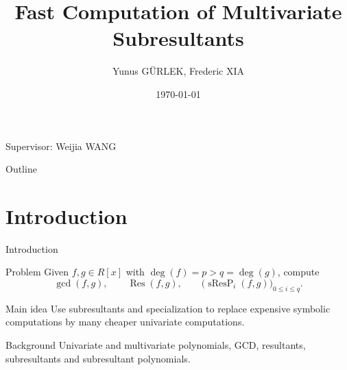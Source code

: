 \documentclass[aspectratio=169]{beamer}
\title{Fast Computation of Multivariate Subresultants}
\author{Yunus GÜRLEK, Frederic XIA}
\date{\today}
\newcommand{\Res}{\operatorname{Res}}
\newcommand{\sResP}{\operatorname{sResP}}
\begin{document}
\begin{frame}
  \centering
  {\Large \inserttitle \par}
  \vspace{1em}

  {\normalsize \insertauthor \par}
  \vspace{0.5em}

  {\small Supervisor: Weijia WANG \par}
  \vspace{1em}

  {\small \insertdate \par}
\end{frame}

\begin{frame}{Outline}
  \tableofcontents
\end{frame}

\setcounter{framenumber}{0}

\section{Introduction}

\begin{frame}{Introduction}
\begin{block}{Problem}
Given $f,g\in R[x]$ with $\deg(f)=p>q=\deg(g)$, compute
\[
  \gcd(f,g), \qquad \Res(f,g), \qquad \bigl(\sResP_i(f,g)\bigr)_{0\le i\le q}.
\]
\end{block}
\pause
\begin{block}{Main idea}
Use subresultants and specialization to replace expensive symbolic computations by many cheaper univariate computations.
\end{block}
\pause
\begin{block}{Background}
Univariate and multivariate polynomials, GCD, resultants, subresultants and subresultant polynomials.
\end{block}
\end{frame}
\end{document}
